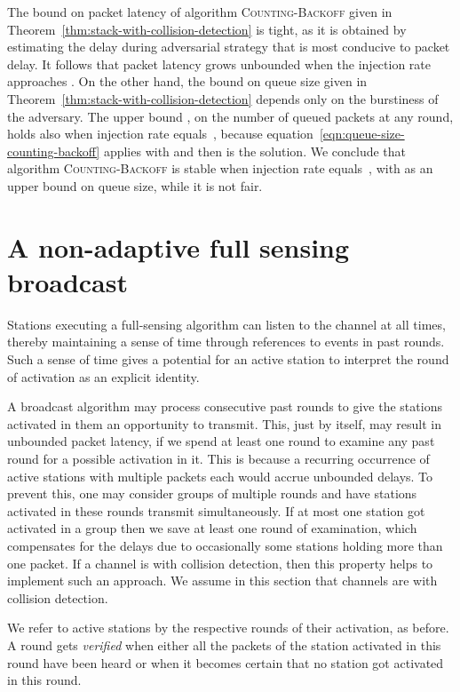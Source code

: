 \documentclass[11pt]{article}
\begin{document}
The  bound on packet latency of algorithm \textsc{Counting-Backoff} given in Theorem~\ref{thm:stack-with-collision-detection} is tight, as it is obtained by estimating the delay during adversarial strategy that is most conducive to packet delay.
It follows that  packet latency grows unbounded when the injection rate  approaches  .
On the other hand, the bound on queue size given in Theorem~\ref{thm:stack-with-collision-detection} depends only on the burstiness of the adversary.
The upper bound , on the number of queued packets at any round, holds also when injection rate equals~, because equation~\eqref{eqn:queue-size-counting-backoff} applies with  and then  is the solution.
We conclude that algorithm \textsc{Counting-Backoff} is stable when injection rate equals~, with  as an upper bound on queue size,  while it is not fair. 



\section{A non-adaptive full sensing broadcast}

\label{sec:full-sensing}



Stations executing a full-sensing algorithm can listen to the channel at all times, thereby maintaining a sense of time through references to events in past rounds.
Such a sense of time gives a potential for an active station to interpret the round of activation as an explicit identity.

A broadcast algorithm may process consecutive past rounds to give the stations activated in them an opportunity to transmit.
This, just by itself, may result in unbounded packet latency, if we spend at least one round to examine any past round for a possible activation in it.
This is because a recurring occurrence of active stations with multiple packets each would accrue unbounded delays.
To prevent this, one may consider groups of multiple rounds and have stations activated in these rounds transmit simultaneously. 
If at most one station got activated in a group then we save at least one round of examination, which compensates for the delays due to occasionally some stations holding more than one packet.
If a channel is with collision detection, then this property helps to implement such an approach.
We assume in this section that channels are with collision detection.


We refer to active stations by the respective rounds of their activation, as before.
A round gets \emph{verified} when either all the packets of the station activated in this round have been heard or when it becomes certain that no station got activated in this round.
\end{document}
